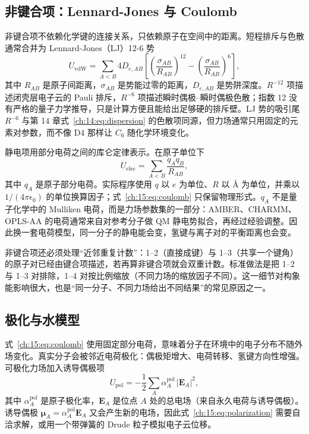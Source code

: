 \subsection{非键合项：Lennard-Jones 与 Coulomb}
\label{ch:15:sec:nonbonded}

非键合项不依赖化学键的连接关系，只依赖原子在空间中的距离。短程排斥与色散通常合并为 Lennard-Jones（LJ）12-6 势
\begin{equation}
U_{\mathrm{vdW}}
= \sum_{A<B} 4D_{e,AB}
\left[\left(\frac{\sigma_{AB}}{R_{AB}}\right)^{12}
-\left(\frac{\sigma_{AB}}{R_{AB}}\right)^{6}\right],
\label{ch:15:eq:lj}
\end{equation}
其中 $R_{AB}$ 是原子间距离，$\sigma_{AB}$ 是势能过零的距离，$D_{e,AB}$ 是势阱深度。$R^{-12}$ 项描述闭壳层电子云的 Pauli 排斥，$R^{-6}$ 项描述瞬时偶极--瞬时偶极色散；指数 12 没有严格的量子力学推导，只是计算方便且能给出足够硬的排斥壁。LJ 势的吸引尾 $R^{-6}$ 与第 14 章式~\eqref{ch:14:eq:dispersion} 的色散项同源\citep{lennardjones1931}，但力场通常只用固定的元素对参数，而不像 D4 那样让 $C_6$ 随化学环境变化。

静电项用部分电荷之间的库仑定律表示。在原子单位下
\begin{equation}
U_{\mathrm{elec}}
= \sum_{A<B}\frac{q_A q_B}{R_{AB}},
\label{ch:15:eq:coulomb}
\end{equation}
其中 $q_A$ 是原子部分电荷。实际程序使用 $q$ 以 $e$ 为单位、$R$ 以 \AA{} 为单位，并乘以 $1/(4\pi\epsilon_0)$ 的单位换算因子；式~\eqref{ch:15:eq:coulomb} 只保留物理形式。$q_A$ 不是量子化学中的 Mulliken 电荷，而是力场参数集的一部分：AMBER、CHARMM、OPLS-AA 的电荷通常来自对参考分子做 QM 静电势拟合，再经过经验调整\citep{cornell1995amber,mackerell1998charmm,jorgensen1996oplsaa}。因此换一套电荷模型，同一分子的静电能会变，氢键与离子对的平衡距离也会变。

非键合项还必须处理“近邻重复计数”：1--2（直接成键）与 1--3（共享一个键角）的原子对已经由键合项描述，若再算非键合项就会双重计数。标准做法是把 1--2 与 1--3 对排除，1--4 对按比例缩放（不同力场的缩放因子不同）。这一细节对构象能影响很大，也是“同一分子、不同力场给出不同结果”的常见原因之一。

\subsection{极化与水模型}
\label{ch:15:sec:polarization}

式~\eqref{ch:15:eq:coulomb} 使用固定部分电荷，意味着分子在环境中的电子分布不随外场变化。真实分子会被邻近电荷极化：偶极矩增大、电荷转移、氢键方向性增强。可极化力场加入诱导偶极项
\begin{equation}
U_{\mathrm{pol}}
= -\frac12\sum_A \alpha_A^{\mathrm{pol}}\,\lvert\mathbf{E}_A\rvert^2,
\label{ch:15:eq:polarization}
\end{equation}
其中 $\alpha_A^{\mathrm{pol}}$ 是原子极化率，$\mathbf{E}_A$ 是位点 $A$ 处的总电场（来自永久电荷与诱导偶极）。诱导偶极 $\boldsymbol{\mu}_A=\alpha_A^{\mathrm{pol}}\mathbf{E}_A$ 又会产生新的电场，因此式~\eqref{ch:15:eq:polarization} 需要自洽求解，或用一个带弹簧的 Drude 粒子模拟电子云位移。


